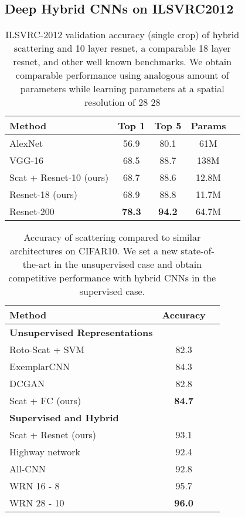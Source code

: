 \documentclass[10pt,twocolumn,letterpaper]{article}
\begin{document}
\subsection{Deep Hybrid CNNs on ILSVRC2012}
\label{hybimnet}
\begin{table}
\begin{center}
\begin{tabular}{|l|c|c|c|c|}
\hline
\bf Method  &\bf Top 1 &\bf Top 5 &\bf Params \\
\hline
AlexNet & 56.9&80.1&61M\\VGG-16 \cite{han2015learning}&68.5&88.7&138M\\Scat + Resnet-10 (ours)&68.7&88.6&12.8M\\Resnet-18 (ours) & 68.9&88.8&11.7M\\Resnet-200 \cite{zagoruyko2016wide} & \textbf{78.3} & \textbf{94.2} & 64.7M  \\\hline
\end{tabular}
\end{center}
\caption{ILSVRC-2012 validation accuracy (single crop) of hybrid scattering and 10 layer resnet, a comparable 18 layer resnet, and other well known benchmarks. We obtain comparable performance using analogous amount of parameters while learning parameters at a spatial resolution of 28  28}
\label{tab:imagenet_full}
\end{table}


\begin{table}
\begin{center}
\begin{tabular}{|l|c|c|}
\hline
\bf Method & \bf Accuracy \\
  \hline 

\small \bf Unsupervised Representations   &  \\
Roto-Scat + SVM   \cite{oyallon2015deep}  &82.3\\
ExemplarCNN \cite{dosovitskiy2014discriminative} & 84.3 \\
DCGAN \cite{radford2015unsupervised}& 82.8 \\
Scat + FC   (ours)     & \bf 84.7\\
\hline
\small \bf Supervised and Hybrid    &  \\
Scat + Resnet  (ours) & 93.1       \\
Highway  network \cite{srivastava2015highway}& 92.4 \\
All-CNN \cite{springenberg2014striving}& 92.8 \\
WRN 16 - 8 \cite{zagoruyko2016wide}  & 95.7\\
WRN 28 - 10 \cite{zagoruyko2016wide} &  \textbf{96.0} \\
\hline
\end{tabular}
\end{center}
\label{tab:CIFAR_Main}
\caption{Accuracy of scattering compared to similar architectures on CIFAR10. We set a new state-of-the-art in the unsupervised case and obtain competitive performance with hybrid CNNs in the supervised case.}
\end{table}
\end{document}
